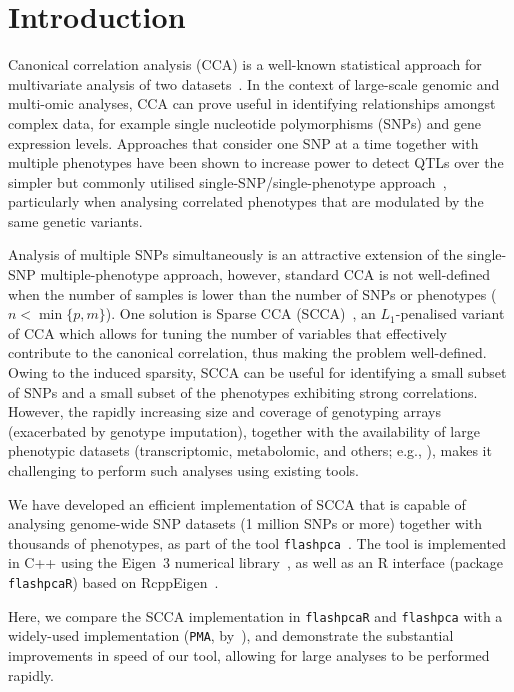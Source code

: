 
\section{Introduction}

Canonical correlation analysis (CCA) is a well-known statistical approach
for multivariate analysis of two datasets~\citep{Hotelling1936}. In the
context of large-scale genomic and multi-omic analyses, CCA can prove useful
in identifying relationships amongst complex data, for example single
nucleotide polymorphisms (SNPs) and gene expression levels. Approaches
that consider one SNP at a time together with multiple phenotypes have
been shown to increase power to detect QTLs over the simpler but commonly
utilised single-SNP/single-phenotype approach~\citep{Ferreira2009,Inouye2012},
particularly when analysing correlated phenotypes that are modulated by the
same genetic variants.

Analysis of multiple SNPs simultaneously is an attractive extension of
the single-SNP multiple-phenotype approach, however, standard CCA is
not well-defined when the number of samples is lower than the number
of SNPs or phenotypes ($n{<}\min\{p, m\}$).  One solution is Sparse
CCA (SCCA)~\citep{Witten2009cshort,Witten2009bshort,Parkhomenko2009},
an $L_1$-penalised variant of CCA which allows for tuning the number of
variables that effectively contribute to the canonical correlation, thus
making the problem well-defined. Owing to the induced sparsity, SCCA can
be useful for identifying a small subset of SNPs and a small subset of the
phenotypes exhibiting strong correlations.  However, the rapidly increasing
size and coverage of genotyping arrays (exacerbated by genotype imputation),
together with the availability of large phenotypic datasets (transcriptomic,
metabolomic, and others; e.g., \citet{Bartel2015,TheGTExConsortium2015}),
makes it challenging to perform such analyses using existing tools.

We have developed an efficient implementation of SCCA that is
capable of analysing genome-wide SNP datasets (1 million SNPs
or more) together with thousands of phenotypes, as part of the tool
\texttt{flashpca}~\citep{Abraham2014}. The tool is implemented in \textsf{C++}
using the Eigen~3 numerical library~\citeeigen, as well as an \textsf{R}
interface (package \texttt{flashpcaR}) based on RcppEigen~\citep{Bates2013}.

Here, we compare the SCCA implementation in \texttt{flashpcaR} and
\texttt{flashpca} with a widely-used implementation (\texttt{PMA},
by~\citet{Witten2013short}), and demonstrate the substantial improvements
in speed of our tool, allowing for large analyses to be performed rapidly.

